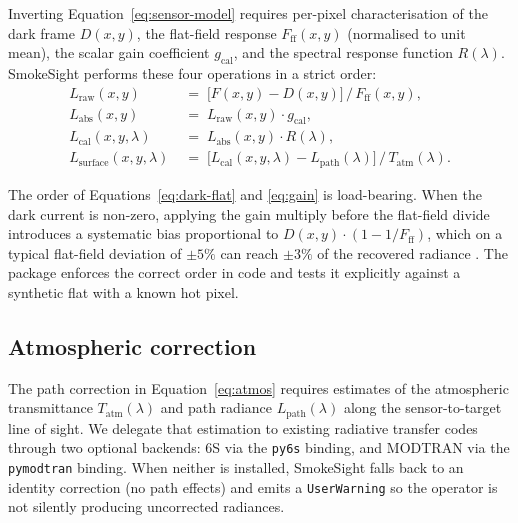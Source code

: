 \documentclass[11pt, a4paper]{article}
\begin{document}
Inverting Equation~\ref{eq:sensor-model} requires per-pixel
characterisation of the dark frame $D(x, y)$, the flat-field response
$F_\text{ff}(x, y)$ (normalised to unit mean), the scalar gain
coefficient $g_\text{cal}$, and the spectral response function
$R(\lambda)$. SmokeSight performs these four operations in a strict
order:
\begin{align}
  L_\text{raw}(x, y)         &\;=\; \bigl[F(x, y) - D(x, y)\bigr] \,/\, F_\text{ff}(x, y), \label{eq:dark-flat} \\
  L_\text{abs}(x, y)         &\;=\; L_\text{raw}(x, y) \cdot g_\text{cal}, \label{eq:gain} \\
  L_\text{cal}(x, y, \lambda)&\;=\; L_\text{abs}(x, y) \cdot R(\lambda), \label{eq:spectral} \\
  L_\text{surface}(x, y, \lambda)
                              &\;=\; \bigl[L_\text{cal}(x, y, \lambda) - L_\text{path}(\lambda)\bigr]
                                     \,/\, T_\text{atm}(\lambda).
                                                                           \label{eq:atmos}
\end{align}

The order of Equations~\ref{eq:dark-flat} and \ref{eq:gain} is
load-bearing. When the dark current is non-zero, applying the gain
multiply before the flat-field divide introduces a systematic bias
proportional to $D(x, y) \cdot (1 - 1/F_\text{ff})$, which on a typical
flat-field deviation of $\pm 5\%$ can reach $\pm 3\%$ of the recovered
radiance \cite{schott2007remote}. The package enforces the correct order
in code and tests it explicitly against a synthetic flat with a known
hot pixel.

\subsection{Atmospheric correction}
\label{sec:atmos}

The path correction in Equation~\ref{eq:atmos} requires estimates of the
atmospheric transmittance $T_\text{atm}(\lambda)$ and path radiance
$L_\text{path}(\lambda)$ along the sensor-to-target line of sight. We
delegate that estimation to existing radiative transfer codes through
two optional backends: 6S \cite{vermote1997second} via the \texttt{py6s}
binding, and MODTRAN \cite{berk2014modtran} via the \texttt{pymodtran}
binding. When neither is installed, SmokeSight falls back to an
identity correction (no path effects) and emits a \texttt{UserWarning}
so the operator is not silently producing uncorrected radiances.
\end{document}

